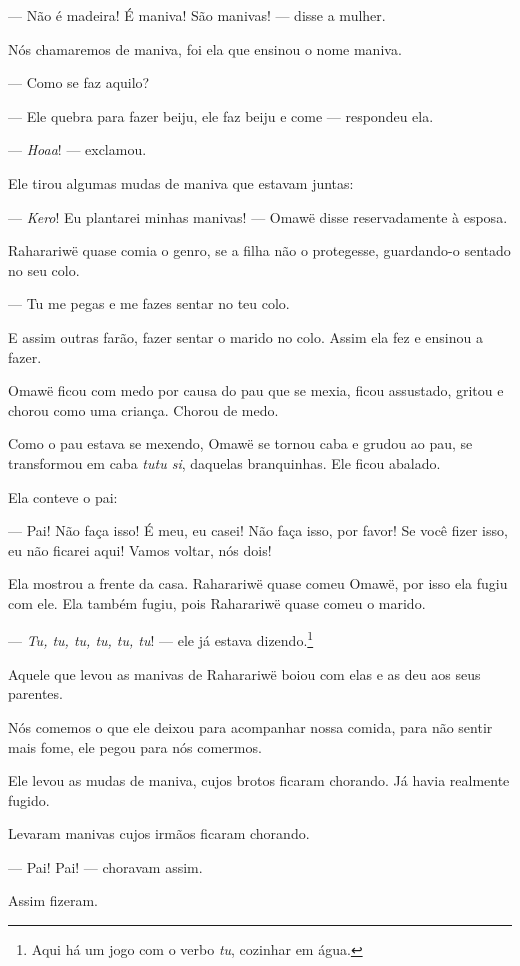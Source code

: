--- Não é madeira! É maniva! São manivas! --- disse a mulher. 

Nós chamaremos de maniva, foi ela que ensinou o nome maniva. 

--- Como se faz aquilo? 

--- Ele quebra para fazer beiju, ele faz beiju e come --- respondeu
 ela.

--- \textit{Hoaa}! --- exclamou. 

Ele tirou algumas mudas de maniva que estavam juntas:

--- \textit{Kero}! Eu plantarei minhas manivas! --- Omawë disse reservadamente à esposa. 

Raharariwë quase comia o genro, se a filha não o protegesse,
guardando-o sentado no seu colo. 

--- Tu me pegas e me fazes sentar no teu colo. 

E assim outras farão, fazer sentar o marido no colo. Assim ela fez e
ensinou a fazer. 

Omawë ficou com medo por causa do pau que se mexia, ficou assustado,
 gritou e chorou como uma criança. Chorou de medo. 

Como o pau estava se mexendo, Omawë se tornou caba e grudou ao pau, se
transformou em caba \textit{tutu si}, daquelas branquinhas. Ele ficou
abalado. 

Ela conteve o pai: 

--- Pai! Não faça isso! É meu, eu casei! Não faça isso, por favor! Se
você fizer isso, eu não ficarei aqui! Vamos voltar, nós dois!

Ela mostrou a frente da casa. Raharariwë quase comeu Omawë, por isso ela
fugiu com ele. Ela também fugiu, pois Raharariwë quase comeu o marido. 

--- \textit{Tu, tu, tu, tu, tu, tu}! --- ele já estava dizendo.\footnote{Aqui há um jogo com o verbo \textit{tu}, cozinhar em água.}

Aquele que levou as manivas de Raharariwë boiou com elas e as deu aos
seus parentes. 

Nós comemos o que ele deixou para acompanhar nossa comida, para não
sentir mais fome, ele pegou para nós comermos. 

Ele levou as mudas de maniva, cujos brotos ficaram chorando. Já havia
realmente fugido. 

Levaram manivas cujos irmãos ficaram chorando. 

--- Pai! Pai! --- choravam assim. 

Assim fizeram.

